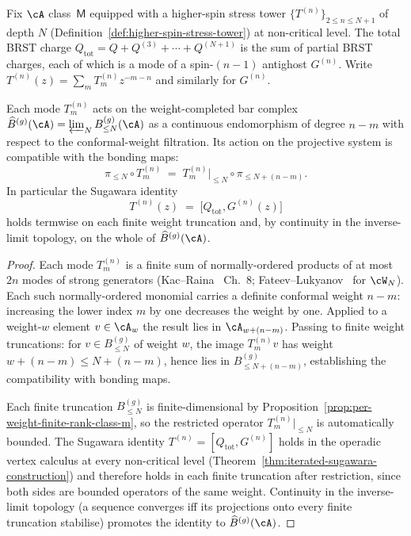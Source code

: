 Fix $\cA$ class~$\mathsf{M}$ equipped with a higher-spin stress tower
$\{T^{(n)}\}_{2 \le n \le N+1}$ of depth $N$
(Definition~\ref{def:higher-spin-stress-tower}) at non-critical level.
The total BRST charge $Q_{\mathrm{tot}} = Q + Q^{(3)} + \cdots + Q^{(N+1)}$
is the sum of partial BRST charges, each of which is a mode of a
spin-$(n-1)$ antighost $G^{(n)}$. Write $T^{(n)}(z)
= \sum_m T^{(n)}_m z^{-m-n}$ and similarly for $G^{(n)}$.

\begin{proposition}
\label{prop:weight-completed-sugawara-convergence}
\ClaimStatusProvedHere
Each mode $T^{(n)}_m$ acts on the weight-completed bar complex
$\widehat{B}^{(g)}(\cA) = \varprojlim_N B^{(g)}_{\le N}(\cA)$ as a
continuous endomorphism of degree $n - m$ with respect to the
conformal-weight filtration. Its action on the projective system is
compatible with the bonding maps:
\[
 \pi_{\le N} \circ T^{(n)}_m
 \;=\;
 T^{(n)}_m\!\big\vert_{\le N} \circ \pi_{\le N + (n - m)}.
\]
In particular the Sugawara identity
\[
 T^{(n)}(z)
 \;=\;
 \bigl[Q_{\mathrm{tot}}, G^{(n)}(z)\bigr]
\]
holds termwise on each finite weight truncation and, by continuity in
the inverse-limit topology, on the whole of $\widehat{B}^{(g)}(\cA)$.
\end{proposition}

\begin{proof}
Each mode $T^{(n)}_m$ is a finite sum of normally-ordered products of
at most $2 n$ modes of strong generators (Kac--Raina~\cite{KacRaina}
Ch.~8; Fateev--Lukyanov~\cite{FL88} for $\cW_N$). Each such
normally-ordered monomial carries a definite conformal weight $n - m$:
increasing the lower index $m$ by one decreases the weight by one.
Applied to a weight-$w$ element $v \in \cA_w$ the result lies in
$\cA_{w + (n - m)}$. Passing to finite weight truncations: for
$v \in B^{(g)}_{\le N}$ of weight $w$, the image
$T^{(n)}_m v$ has weight $w + (n - m) \le N + (n - m)$, hence lies in
$B^{(g)}_{\le N + (n - m)}$, establishing the compatibility with
bonding maps.

Each finite truncation $B^{(g)}_{\le N}$ is finite-dimensional by
Proposition~\ref{prop:per-weight-finite-rank-class-m}, so the
restricted operator $T^{(n)}_m\!\big\vert_{\le N}$ is automatically
bounded. The Sugawara identity $T^{(n)} = [Q_{\mathrm{tot}}, G^{(n)}]$
holds in the operadic vertex calculus at every non-critical level
(Theorem~\ref{thm:iterated-sugawara-construction}) and therefore holds
in each finite truncation after restriction, since both sides are
bounded operators of the same weight. Continuity in the inverse-limit
topology (a sequence converges iff its projections onto every finite
truncation stabilise) promotes the identity to $\widehat{B}^{(g)}(\cA)$.
\end{proof}

